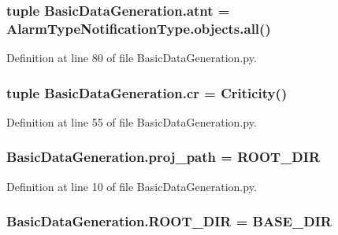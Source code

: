 \subsubsection[{atnt}]{\setlength{\rightskip}{0pt plus 5cm}tuple Basic\+Data\+Generation.\+atnt = Alarm\+Type\+Notification\+Type.\+objects.\+all()}\label{namespace_basic_data_generation_a9bbccf8a803bc653ecc2dde0c79ce638}


Definition at line 80 of file Basic\+Data\+Generation.\+py.

\hypertarget{namespace_basic_data_generation_a92305bfb85f8c33498e7deec34b189f8}{}
\subsubsection[{cr}]{\setlength{\rightskip}{0pt plus 5cm}tuple Basic\+Data\+Generation.\+cr = {\bf Criticity}()}\label{namespace_basic_data_generation_a92305bfb85f8c33498e7deec34b189f8}


Definition at line 55 of file Basic\+Data\+Generation.\+py.

\hypertarget{namespace_basic_data_generation_aba88e6c9fac18290407d6547357b533f}{}
\subsubsection[{proj\+\_\+path}]{\setlength{\rightskip}{0pt plus 5cm}Basic\+Data\+Generation.\+proj\+\_\+path = {\bf R\+O\+O\+T\+\_\+\+D\+I\+R}}\label{namespace_basic_data_generation_aba88e6c9fac18290407d6547357b533f}


Definition at line 10 of file Basic\+Data\+Generation.\+py.

\hypertarget{namespace_basic_data_generation_ac7a32de6b13ab8024bb25d34167992a2}{}
\subsubsection[{R\+O\+O\+T\+\_\+\+D\+I\+R}]{\setlength{\rightskip}{0pt plus 5cm}Basic\+Data\+Generation.\+R\+O\+O\+T\+\_\+\+D\+I\+R = B\+A\+S\+E\+\_\+\+D\+I\+R}\label{namespace_basic_data_generation_ac7a32de6b13ab8024bb25d34167992a2}


